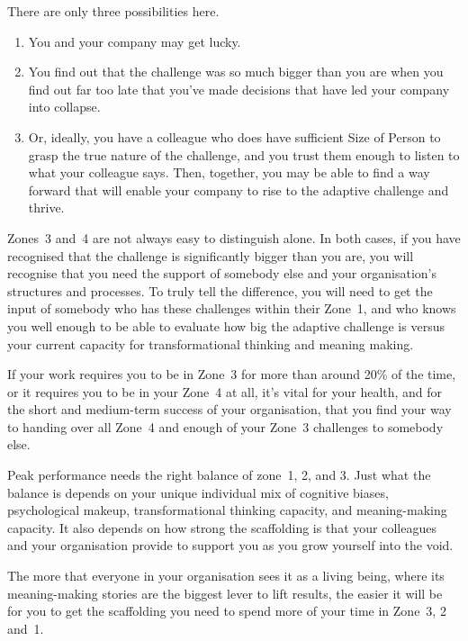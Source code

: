 There are only three possibilities here. 


\begin{enumerate}
\item You and your company may get lucky. 
\item You find out that the challenge was so much bigger than you are when you find out far too late that you've made decisions that have led your company into collapse.
\item Or, ideally, you have a colleague who does have sufficient Size of Person to grasp the true nature of the challenge, and you trust them enough to listen to what your colleague says. Then, together, you may be able to find a way forward that will enable your company to rise to the adaptive challenge and thrive.
\end{enumerate}


Zones~3 and~4 are not always easy to distinguish alone. In both cases, if you have recognised that the challenge is significantly bigger than you are, you will recognise that you need the support of somebody else and your organisation's structures and processes. To truly tell the difference, you will need to get the input of somebody who has these challenges within their Zone~1, and who knows you well enough to be able to evaluate how big the adaptive challenge is versus your current capacity for transformational thinking and meaning making.


If your work requires you to be in Zone~3 for more than around 20\% of the time, or it requires you to be in your Zone~4 at all, it's vital for your health, and for the short and medium-term success of your organisation, that you find your way to handing over all Zone~4 and enough of your Zone~3 challenges to somebody else.


Peak performance needs the right balance of zone~1, 2, and 3. Just what the balance is depends on your unique individual mix of cognitive biases, psychological makeup, transformational thinking capacity, and meaning\hyp{}making capacity. It also depends on how strong the scaffolding is that your colleagues and your organisation provide to support you as you grow yourself into the void. 


The more that everyone in your organisation  sees it as a living being, where its meaning\hyp{}making stories are the biggest lever to lift results, the easier it will be for you to get the scaffolding you need to spend more of your time in Zone~3, 2 and~1.


